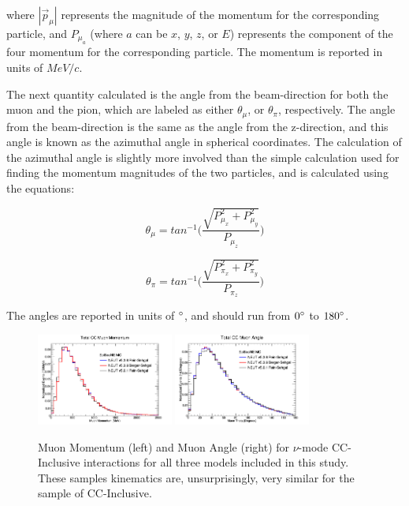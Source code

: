 \documentclass[11pt]{article}
\begin{document}
\noindent
where $|\vec{p}_\mu|$ represents the magnitude of the momentum for the corresponding particle, and $P_{\mu_a}$ (where $a$ can be $x$, $y$, $z$, or $E$) represents the component of the four momentum for the corresponding particle. The momentum is reported in units of $MeV/c$.

The next quantity calculated is the angle from the beam-direction for both the muon and the pion, which are labeled as either $\theta_\mu$, or $\theta_\pi$, respectively. The angle from the beam-direction is the same as the angle from the z-direction, and this angle is known as the azimuthal angle in spherical coordinates. The calculation of the azimuthal angle is slightly more involved than the simple calculation used for finding the momentum magnitudes of the two particles, and is calculated using the equations:

\begin{equation}
\theta_\mu = tan^{-1}\Bigg(\frac{\sqrt{P_{\mu_x}^2 + P_{\mu_y}^2}}{P_{\mu_z}}\Bigg)
\end{equation}

\begin{equation}
\theta_\pi = tan^{-1}\Bigg(\frac{\sqrt{P_{\pi_x}^2 + P_{\pi_y}^2}}{P_{\pi_z}}\Bigg)
\end{equation}

\noindent
The angles are reported in units of $\degree$, and should run from $0\degree$ to $180\degree$.

\begin{figure}[H]
\centering
\includegraphics[width=0.4\textwidth]{CCInclusivePlots/NMCCInclusiveTotalMomentum.png}
\includegraphics[width=0.4\textwidth]{CCInclusivePlots/NMCCInclusiveTotalAngle.png}
\caption{Muon Momentum (left) and Muon Angle (right) for $\nu$-mode CC-Inclusive interactions for all three models included in this study. These samples kinematics are, unsurprisingly, very similar for the sample of CC-Inclusive.}
\label{fig:NuModeCCInclusiveMomAndAng}
\end{figure}
\end{document}
